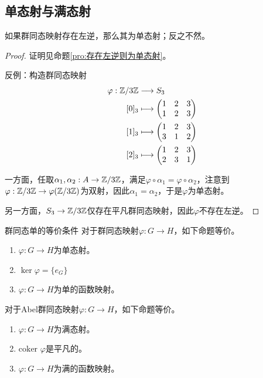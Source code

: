 \subsection{单态射与满态射}

\begin{proposition}
	如果群同态映射存在左逆，那么其为单态射；反之不然。
\end{proposition}

\begin{proof}
	证明见命题\ref{pro:存在左逆则为单态射}。
	
	反例：构造群同态映射
	\begin{align*}
		\varphi:\begin{aligned}[t]
			\mathbb{Z}/3\mathbb{Z}&\longrightarrow S_3\\
			[0]_3&\longmapsto\begin{pmatrix}1&2&3\\1&2&3\end{pmatrix}\\
			[1]_3&\longmapsto\begin{pmatrix}1&2&3\\3&1&2\end{pmatrix}\\
			[2]_3&\longmapsto\begin{pmatrix}1&2&3\\2&3&1\end{pmatrix}
		\end{aligned}
	\end{align*}

	一方面，任取$\alpha_1,\alpha_2:A\to \mathbb{Z}/3\mathbb{Z}$，满足$\varphi\circ \alpha_1=\varphi\circ \alpha_2$，注意到$\varphi:\mathbb{Z}/3\mathbb{Z}\to \varphi(\mathbb{Z}/3\mathbb{Z})$为双射，因此$\alpha_1=\alpha_2$，于是$\varphi$为单态射。
	
	另一方面，$S_3\to \mathbb{Z}/3\mathbb{Z}$仅存在平凡群同态映射，因此$\varphi$不存在左逆。
\end{proof}

\begin{proposition}{}{群同态单的等价条件}
	对于群同态映射$\varphi:G\to H$，如下命题等价。
	\begin{enumerate}
		\item $\varphi:G\to H$为单态射。
		\item $\ker\varphi=\{e_G\}$
		\item $\varphi:G\to H$为单的函数映射。
	\end{enumerate}
\end{proposition}

\begin{proposition}
	对于Abel群同态映射$\varphi:G\to H$，如下命题等价。
	\begin{enumerate}
		\item $\varphi:G\to H$为满态射。
		\item $\text{coker }\varphi$是平凡的。
		\item $\varphi:G\to H$为满的函数映射。
	\end{enumerate}
\end{proposition}

